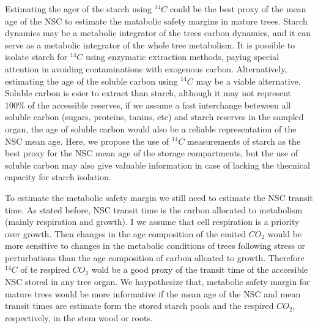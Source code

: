 \documentclass{article}
\begin{document}
Estimating the ager of the starch using $^{14}C$ could be the best proxy of the mean age of the NSC to estimate the matabolic safety margins in mature trees. 
Starch dynamics may be a metabolic integrator of the trees carbon dynamics, and it can serve as a metabolic integrator of the whole tree metabolism. 
It is possible to isolate starch for $^{14}C$ using enzymatic extraction methods, paying special attention in avoiding contaminations with exogenous carbon. 
Alternatively, estimating the age of the soluble carbon using $^{14}C$ may be a viable alternative. 
Soluble carbon is esier to extract than starch, although it may not represent 100\% of the accessible reserves, if we assume a fast interchange beteween all soluble carbon (sugars, proteins, tanins, etc) and starch reserves in the sampled organ, the age of soluble carbon would also be a reliable representation of the NSC mean age. 
Here, we propose the use of $^{14}C$ measurements of starch as the best proxy for the NSC mean age of the storage compartments, but the use of soluble carbon may also give valuable information in case of lacking the thecnical capacity for starch isolation. 


To estimate the metabolic safety margin we still need to estimate the NSC transit time.
As stated before, NSC transit time is the carbon allocated to metabolism (mainly respiration and growth).  
I we assume that cell respiration is a priority over growth.
Then changes in the age composition of the emited $CO_{2}$ would be more sensitive to changes in the metabolic conditions of trees following stress or perturbations than the age composition of carbon alloated to growth.  
Therefore $^{14}C$ of te respired $CO_{2}$ wold be a good proxy of the transit time of the acccesible NSC stored in any tree organ.  
We haypothesize that, metabolic safety margin for mature trees would be more informative if the mean age of the NSC and mean transit times are estimate form the stored starch pools and the respired $CO_{2}$, respectively, in the stem wood or roots.

\end{document}
